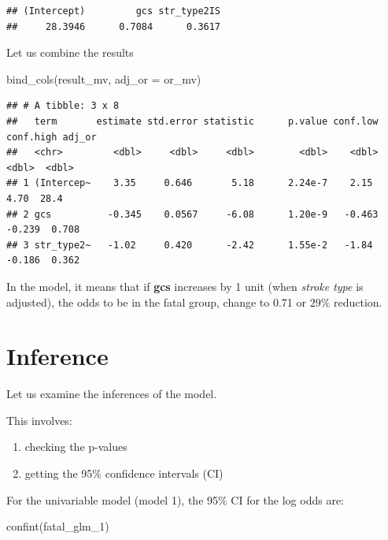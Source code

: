 \documentclass[
]{book}
\makeatletter
\newenvironment{Shaded}{\begin{snugshade}}{\end{snugshade}}
\newcommand{\AttributeTok}[1]{\textcolor[rgb]{0.61,0.61,0.61}{#1}}
\newcommand{\FunctionTok}[1]{\textcolor[rgb]{0,0,0}{#1}}
\newcommand{\NormalTok}[1]{#1}
\providecommand{\tightlist}{%
  \setlength{\itemsep}{0pt}\setlength{\parskip}{0pt}}
\newenvironment{kframe}{%
\medskip{}
\setlength{\fboxsep}{.8em}
 \def\at@end@of@kframe{}%
 \ifinner\ifhmode%
  \def\at@end@of@kframe{\end{minipage}}%
  \begin{minipage}{\columnwidth}%
 \fi\fi%
 \def\FrameCommand##1{\hskip\@totalleftmargin \hskip-\fboxsep
 \colorbox{shadecolor}{##1}\hskip-\fboxsep
     \hskip-\linewidth \hskip-\@totalleftmargin \hskip\columnwidth}%
 \MakeFramed {\advance\hsize-\width
   \@totalleftmargin\z@ \linewidth\hsize
   \@setminipage}}%
 {\par\unskip\endMakeFramed%
 \at@end@of@kframe}
\renewenvironment{Shaded}{\begin{kframe}}{\end{kframe}}
\makeatother
\begin{document}
\begin{verbatim}
## (Intercept)         gcs str_type2IS 
##     28.3946      0.7084      0.3617
\end{verbatim}

Let us combine the results

\begin{Shaded}
\begin{Highlighting}[]
\FunctionTok{bind\_cols}\NormalTok{(result\_mv, }\AttributeTok{adj\_or =}\NormalTok{ or\_mv)}
\end{Highlighting}
\end{Shaded}

\begin{verbatim}
## # A tibble: 3 x 8
##   term       estimate std.error statistic      p.value conf.low conf.high adj_or
##   <chr>         <dbl>     <dbl>     <dbl>        <dbl>    <dbl>     <dbl>  <dbl>
## 1 (Intercep~    3.35     0.646       5.18      2.24e-7    2.15      4.70  28.4  
## 2 gcs          -0.345    0.0567     -6.08      1.20e-9   -0.463    -0.239  0.708
## 3 str_type2~   -1.02     0.420      -2.42      1.55e-2   -1.84     -0.186  0.362
\end{verbatim}

In the model, it means that if \textbf{gcs} increases by 1 unit (when \emph{stroke type} is adjusted), the odds to be in the fatal group, change to 0.71 or \(29\%\) reduction.

\hypertarget{inference}{%
\section{Inference}\label{inference}}

Let us examine the inferences of the model.

This involves:

\begin{enumerate}
\def\labelenumi{\arabic{enumi}.}
\tightlist
\item
  checking the p-values
\item
  getting the 95\% confidence intervals (CI)
\end{enumerate}

For the univariable model (model 1), the 95\% CI for the log odds are:

\begin{Shaded}
\begin{Highlighting}[]
\FunctionTok{confint}\NormalTok{(fatal\_glm\_1)}
\end{Highlighting}
\end{Shaded}
\end{document}
